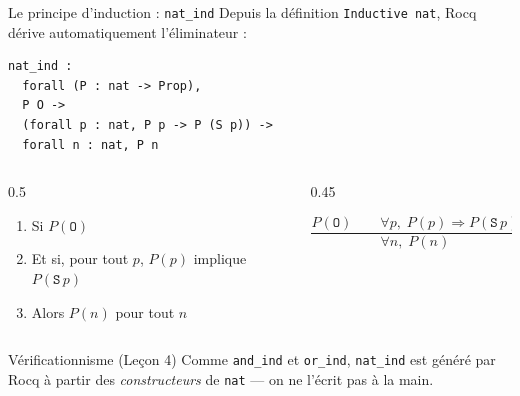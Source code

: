 \documentclass[aspectratio=169]{beamer}
\begin{document}
\begin{frame}[fragile]{Le principe d'induction : \texttt{nat\_ind}}
  Depuis la définition \texttt{Inductive nat}, Rocq dérive automatiquement l'éliminateur :
  \medskip
\begin{verbatim}
nat_ind :
  forall (P : nat -> Prop),
  P O ->
  (forall p : nat, P p -> P (S p)) ->
  forall n : nat, P n
\end{verbatim}
  \pause
  \begin{columns}
    \begin{column}{0.5\textwidth}
      \begin{enumerate}
        \item Si $P(\texttt{O})$
        \item Et si, pour tout $p$, $P(p)$ implique $P(\texttt{S}\,p)$
        \item Alors $P(n)$ pour tout $n$
      \end{enumerate}
    \end{column}
    \begin{column}{0.45\textwidth}
      \begin{center}
        \Large
        $\dfrac{P(\texttt{O}) \qquad \forall p,\; P(p) \Rightarrow P(\texttt{S}\,p)}{\forall n,\; P(n)}$
      \end{center}
    \end{column}
  \end{columns}
  \pause
  \begin{block}{Vérificationnisme (Leçon 4)}
    Comme \texttt{and\_ind} et \texttt{or\_ind}, \texttt{nat\_ind} est généré par Rocq
    à partir des \emph{constructeurs} de \texttt{nat} — on ne l'écrit pas à la main.
  \end{block}
\end{frame}
\end{document}
